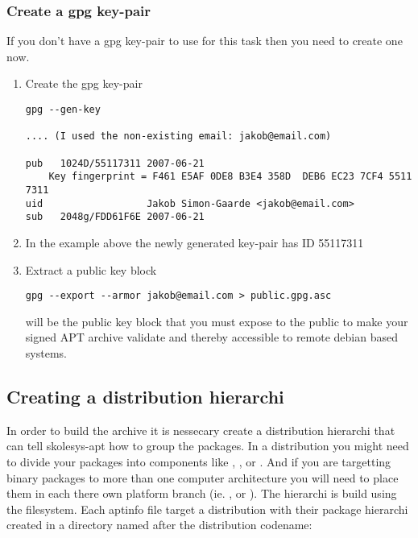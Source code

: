 \subsubsection{Create a gpg key-pair\label{skolesys-apt-creategpg}}
If you don't have a gpg key-pair to use for this task then you need to create one now.
\begin{enumerate}
 \item Create the gpg key-pair
 \begin{verbatim}
gpg --gen-key

.... (I used the non-existing email: jakob@email.com)

pub   1024D/55117311 2007-06-21
	Key fingerprint = F461 E5AF 0DE8 B3E4 358D  DEB6 EC23 7CF4 5511 7311
uid                  Jakob Simon-Gaarde <jakob@email.com>
sub   2048g/FDD61F6E 2007-06-21
 \end{verbatim}

 \item In the example above the newly generated key-pair has ID 55117311
 \item Extract a public key block	
 \begin{verbatim}
gpg --export --armor jakob@email.com > public.gpg.asc
 \end{verbatim}

  will be the public key block that you must expose to the public to make your signed APT archive validate and thereby accessible to remote debian based systems.

\end{enumerate}

\subsection{Creating a distribution hierarchi\label{skolesys-apt-pool}}
In order to build the archive it is nessecary create a distribution hierarchi that can tell skolesys-apt how to group the packages. In a distribution you might need to divide your packages into components like , ,  or . And if you are targetting binary packages to more than one computer architecture you will need to place them in each there own platform branch (ie. ,  or ). The hierarchi is build using the filesystem. Each aptinfo file target a distribution with their package hierarchi created in a directory named after the distribution codename:

